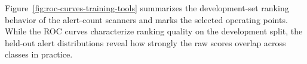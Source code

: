 







Figure~\ref{fig:roc-curves-training-tools} summarizes the
development-set ranking behavior of the alert-count scanners and marks
the selected operating points.
While the ROC curves characterize ranking quality on the development split, the held-out alert distributions reveal how strongly the raw scores overlap across classes in practice.




